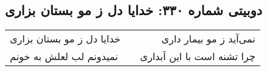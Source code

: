 \begin{center}
\section*{دوبیتی شماره ۳۳۰: خدایا دل ز مو بستان بزاری}
\label{sec:330}
\begin{longtable}{l p{0.5cm} r}
خدایا دل ز مو بستان بزاری
&&
نمی‌آید ز مو بیمار داری
\\
نمیدونم لب لعلش به خونم
&&
چرا تشنه است با این آبداری
\\
\end{longtable}
\end{center}
